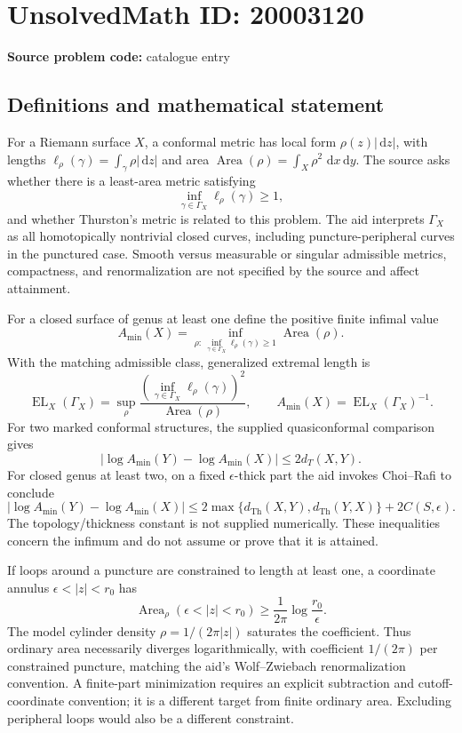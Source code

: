 \documentclass[11pt]{article}
\newcommand{\dd}{\,\mathrm{d}}
\begin{document}
\section*{UnsolvedMath ID: 20003120}
\textbf{Source problem code:} catalogue entry
\subsection{Definitions and mathematical statement}
For a Riemann surface $X$, a conformal metric has local form $\rho(z)|\dd z|$, with lengths $\ell_\rho(\gamma)=\int_\gamma\rho|\dd z|$ and area $\operatorname{Area}(\rho)=\int_X\rho^2\,\dd x\dd y$. The source asks whether there is a least-area metric satisfying
\[
\inf_{\gamma\in\Gamma_X}\ell_\rho(\gamma)\geq1,
\]
and whether Thurston's metric is related to this problem. The aid interprets $\Gamma_X$ as all homotopically nontrivial closed curves, including puncture-peripheral curves in the punctured case. Smooth versus measurable or singular admissible metrics, compactness, and renormalization are not specified by the source and affect attainment.

For a closed surface of genus at least one define the positive finite infimal value
\[
A_{\min}(X)=\inf_{\rho:\ \inf_{\gamma\in\Gamma_X}\ell_\rho(\gamma)\geq1}\operatorname{Area}(\rho).
\]
With the matching admissible class, generalized extremal length is
\[
\operatorname{EL}_X(\Gamma_X)=\sup_\rho
\frac{(\inf_{\gamma\in\Gamma_X}\ell_\rho(\gamma))^2}{\operatorname{Area}(\rho)},
\qquad A_{\min}(X)=\operatorname{EL}_X(\Gamma_X)^{-1}.
\]
For two marked conformal structures, the supplied quasiconformal comparison gives
\[
|\log A_{\min}(Y)-\log A_{\min}(X)|\leq2d_T(X,Y).
\]
For closed genus at least two, on a fixed $\epsilon$-thick part the aid invokes Choi--Rafi to conclude
\[
|\log A_{\min}(Y)-\log A_{\min}(X)|\leq
2\max\{d_{\mathrm{Th}}(X,Y),d_{\mathrm{Th}}(Y,X)\}+2C(S,\epsilon).
\]
The topology/thickness constant is not supplied numerically. These inequalities concern the infimum and do not assume or prove that it is attained.

If loops around a puncture are constrained to length at least one, a coordinate annulus $\epsilon<|z|<r_0$ has
\[
\operatorname{Area}_\rho(\epsilon<|z|<r_0)\geq\frac1{2\pi}\log\frac{r_0}{\epsilon}.
\]
The model cylinder density $\rho=1/(2\pi|z|)$ saturates the coefficient. Thus ordinary area necessarily diverges logarithmically, with coefficient $1/(2\pi)$ per constrained puncture, matching the aid's Wolf--Zwiebach renormalization convention. A finite-part minimization requires an explicit subtraction and cutoff-coordinate convention; it is a different target from finite ordinary area. Excluding peripheral loops would also be a different constraint.
\end{document}
